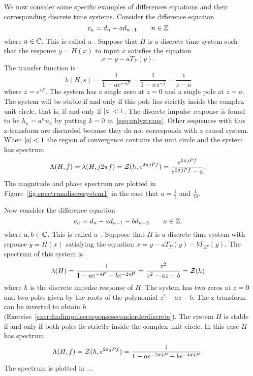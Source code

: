 We now consider some specific examples of differences equations and their corresponding discrete time systems.  Consider the difference equation
\[
c_n = d_n + a d_{n-1} \qquad n \in {\mathbb Z}
\]
where $a \in {\mathbb C}$.  This is called a .  Suppose that $H$ is a discrete time system such that the response $y = H(x)$ to input $x$ satisfies the equation
\[
x = y - a T_{P}(y).
\]
The transfer function is
\[
\lambda(H,s) = \frac{1}{1 - a e^{-sP}} = \frac{1}{1 - a z^{-1}} = \frac{z}{z - a}
\]
where $z = e^{sP}$.  The system has a single zero at $z=0$ and a single pole at $z = a$.  The system will be stable if and only if this pole lies strictly inside the complex unit circle, that is, if and only if $\left\vert a \right\vert < 1$.  The discrete impulse response is found to be $h_n = a^n u_n$ by putting $k=0$ in~\eqref{eeq:onlyztrans}.  Other sequences with this z-transform are discarded because they do not corresponds with a causal system.  %
When $\left\vert a \right\vert < 1$ the region of convergence contains the unit circle and the system has spectrum
\[
\Lambda(H,f) = \lambda(H,j2\pi f) = {\mathcal Z}(h, e^{2\pi j P f}) = \frac{e^{2\pi j P f}}{e^{2\pi j P f} - a}.
\]
The magnitude and phase spectrum are plotted in Figure~\ref{fig:spectrumdiscresystem1} in the case that $a = \tfrac{1}{2}$ and $\tfrac{1}{10}$.

Now consider the difference equation
\[
c_n = d_n - a d_{n-1} - b d_{n-2} \qquad n \in {\mathbb Z}.
\]
where $a,b \in {\mathbb C}$.  This is called a~.  Suppose that $H$ is a discrete time system with reponse $y=H(x)$ satisfying the equation $x = y - aT_{P}(y) - b T_{2P}(y)$.  The spectrum of this system is
\[
\lambda(H) = \frac{1}{1 - a e^{-sP} - b e^{-2sP}} = \frac{z^2}{z^2 - a z - b} = {\mathcal Z}(h)
\]
where $h$ is the discrete impulse response of $H$.  The system has two zeros at $z = 0$ and two poles given by the roots of the polynomial $z^2 - a z - b$.  The z-transform can be inverted to obtain $h$ (Exercise~\ref{exer:findimpulseresponsesecondorderdiscrete}).  The system $H$ is stable if and only if both poles lie strictly inside the complex unit circle.  In this case $H$ has spectrum
\[
\Lambda(H,f) = {\mathcal Z}(h, e^{2\pi j P f}) = \frac{1}{1 - a e^{-2\pi jP} - b e^{-4\pi jP}}.
\]
The spectrum is plotted in ...

